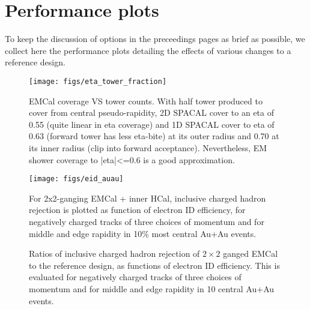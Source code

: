 
\chapter*{Performance plots}
\label{cha:performance-plots}

To keep the discussion of options in the preceedings pages as brief as
possible, we collect here the performance plots detailing the effects
of various changes to a reference design.

\begin{figure}[hbt]
  \centering
  \texttt{[image: figs/eta\_tower\_fraction]}
  \caption{EMCal coverage VS tower counts. With half tower produced to cover from central pseudo-rapidity, 2D SPACAL cover to an eta of 0.55 (quite linear in eta coverage) and 1D SPACAL cover to eta of 0.63 (forward tower has less eta-bite) at its outer radius and 0.70 at its inner radius (clip into forward acceptance). Nevertheless, EM shower coverage to |eta|<=0.6 is a good approximation.}
  \label{fig:eta_tower_fraction}
\end{figure}

\begin{figure}[hbt]
  \centering
  \texttt{[image: figs/eid\_auau]}
  \caption{For 2x2-ganging EMCal + inner HCal, inclusive charged
    hadron rejection is plotted as function of electron ID efficiency,
    for negatively charged tracks of three choices of momentum and for
    middle and edge rapidity in 10\% most central Au+Au events.}
  \label{fig:eid_auau}
\end{figure}

\begin{figure}[hbt]
  \centering

  \caption{ Ratios of inclusive charged hadron rejection of $2\times2$ ganged
 EMCal to the reference design, as functions of electron ID
 efficiency. This is evaluated for negatively charged tracks of three
 choices of momentum and for middle and edge rapidity in 10%
 central Au+Au events.}
\label{fig:eid_ratios_auau}
\end{figure}